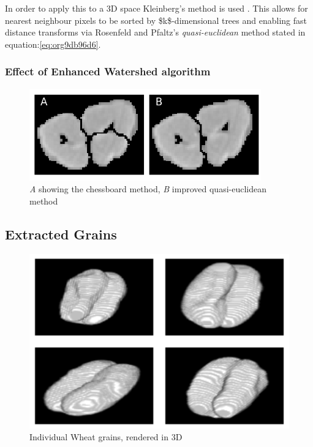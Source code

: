 \documentclass[11pt]{report}
\begin{document}
In order to apply this to a 3D space Kleinberg's method is used  \cite{Kleinberg1997}. This allows for nearest neighbour pixels to be sorted by \$k\$-dimensional trees
and enabling fast distance transforms via Rosenfeld and Pfaltz's \emph{quasi-euclidean} method stated in equation:\ref{eq:org9db96d6}.
\subsubsection{Effect of Enhanced Watershed algorithm}
\label{sec:orga88613c}
\begin{center}
\begin{figure}[htbp]
\centering
\includegraphics[width=10cm]{./images/chess_quasi.png}
\caption{\label{fig:orgb899973}
\emph{A} showing the chessboard method, \emph{B} improved quasi-euclidean method}
\end{figure}
\end{center}

\subsection{Extracted Grains}
\label{sec:orgc7cfce7}

\begin{figure}[htbp]
\centering
\includegraphics[width=13cm]{./images/ctgrains.png}
\caption{\label{fig:orge8fe82b}
Individual Wheat grains, rendered in 3D}
\end{figure}
\end{document}
